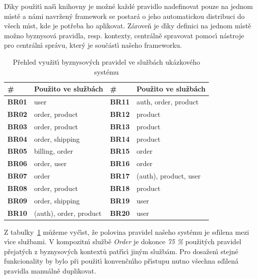 D\'{\i}ky použit\'{\i} naš\'{\i} knihovny je možné každé pravidlo nadefinovat pouze na jednom m\'{\i}stě
a námi navržen\'y framework se postará o jeho automatickou distribuci do všech m\'{\i}st, kde
je potřeba ho aplikovat. Zároveň je d\'{\i}ky definici na jednom m\'{\i}stě možno byznysová pravidla, resp.
kontexty, centrálně spravovat pomoc\'{\i} nástroje pro centráln\'{\i} správu, kter\'y je součást\'{\i}
našeho frameworku.

\begin{table}
    \centering
    \begin{tabularx}{\textwidth}{ l X | l X }
        \hline
        \textbf{\#} & \textbf{Použito ve službách} & \textbf{\#} & \textbf{Použito ve službách} \\ \hline \hline
        \textbf{BR01} & user & \textbf{BR11} & auth, order, product \\
        \textbf{BR02} & order, product & \textbf{BR12} & product \\
        \textbf{BR03} & order, product & \textbf{BR13} & product \\
        \textbf{BR04} & order, shipping & \textbf{BR14} & product \\
        \textbf{BR05} & billing, order & \textbf{BR15} & order \\
        \textbf{BR06} & order, user & \textbf{BR16} & order \\
        \textbf{BR07} & order & \textbf{BR17} & (auth), product, user \\
        \textbf{BR08} & order, product & \textbf{BR18} & product \\
        \textbf{BR09} & order, shipping & \textbf{BR19} & user \\
        \textbf{BR10} & (auth), order, product & \textbf{BR20} & user \\
        \hline
    \end{tabularx}
    \caption{Přehled využit\'{\i} byznysov\'ych pravidel ve službách ukázkového systému}
    \label{tbl:duplication}
\end{table}

Z tabulky~\ref{tbl:duplication} můžeme vyč\'{\i}st, že polovina pravidel našeho systému
je sd\'{\i}lena mezi v\'{\i}ce službami. V kompozitn\'{\i} službě \textit{Order} je dokonce
\textit{75 \%} použit\'ych pravidel přejat\'ych z byznysov\'ych kontextů patř\'{\i}c\'{\i} jin\'ym službám.
Pro dosažen\'{\i} stejné funkcionality by bylo při použit\'{\i} konvenčn\'{\i}ho př\'{\i}stupu nutno všechna
sd\'{\i}lená pravidla manuálně duplikovat.

